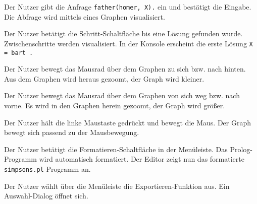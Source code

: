 \documentclass[parskip=full,11pt,twoside]{scrartcl}
\begin{document}
{Der Nutzer gibt die Anfrage \texttt{father(homer, X).} ein und bestätigt die Eingabe.}
{Die Abfrage wird mittels eines Graphen visualisiert.}

{Der Nutzer betätigt die Schritt-Schaltfläche bis eine Lösung gefunden wurde.}
{Zwischenschritte werden visualisiert. In der Konsole erscheint die erste Lösung \texttt{X = bart .}}



{Der Nutzer bewegt das Mausrad über dem Graphen zu sich bzw. nach hinten.}
{Aus dem Graphen wird heraus gezoomt, der Graph wird kleiner.}

{Der Nutzer bewegt das Mausrad über dem Graphen von sich weg bzw. nach vorne.}
{Es wird in den Graphen herein gezoomt, der Graph wird größer.}



{Der Nutzer hält die linke Maustaste gedrückt und bewegt die Maus.}
{Der Graph bewegt sich passend zu der Mausbewegung.}



{Der Nutzer betätigt die Formatieren-Schaltfläche in der Menüleiste.}
{Das Prolog-Programm wird automatisch formatiert. Der Editor zeigt nun das formatierte \texttt{simpsons.pl}-Programm an.}



{Der Nutzer wählt über die Menüleiste die Exportieren-Funktion aus.}
{Ein Auswahl-Dialog öffnet sich.}
\end{document}
